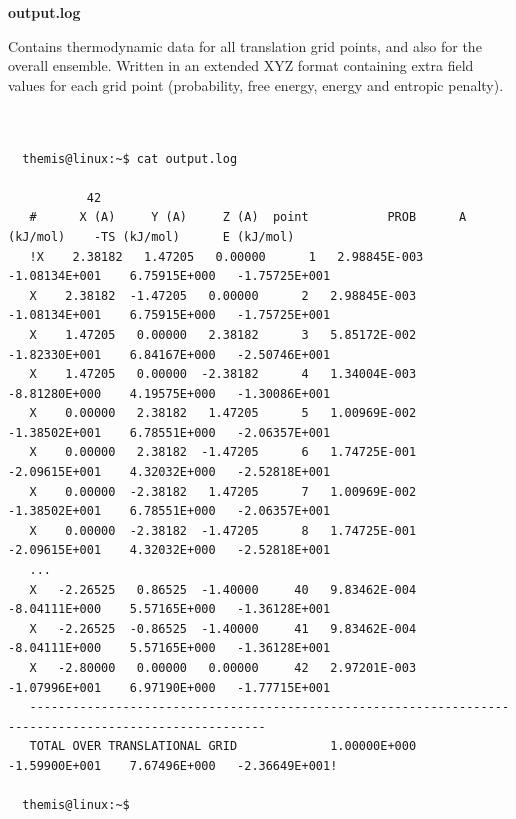 \documentclass[10pt,a4paper]{report}
\begin{document}
\textbf{output.log}

  Contains thermodynamic data for all translation grid points, and also for the
  overall ensemble. Written in an extended XYZ format containing extra field values 
  for each grid point (probability, free energy, energy and entropic penalty). \\~


\begin{center}
  \begin{minipage}{0.90\textwidth}
    \vskip0.25cm
    \begin{verbatim}

  themis@linux:~$ cat output.log

           42
   #      X (A)     Y (A)     Z (A)  point           PROB      A (kJ/mol)    -TS (kJ/mol)      E (kJ/mol)
   !X    2.38182   1.47205   0.00000      1   2.98845E-003   -1.08134E+001    6.75915E+000   -1.75725E+001
   X    2.38182  -1.47205   0.00000      2   2.98845E-003   -1.08134E+001    6.75915E+000   -1.75725E+001
   X    1.47205   0.00000   2.38182      3   5.85172E-002   -1.82330E+001    6.84167E+000   -2.50746E+001
   X    1.47205   0.00000  -2.38182      4   1.34004E-003   -8.81280E+000    4.19575E+000   -1.30086E+001
   X    0.00000   2.38182   1.47205      5   1.00969E-002   -1.38502E+001    6.78551E+000   -2.06357E+001
   X    0.00000   2.38182  -1.47205      6   1.74725E-001   -2.09615E+001    4.32032E+000   -2.52818E+001
   X    0.00000  -2.38182   1.47205      7   1.00969E-002   -1.38502E+001    6.78551E+000   -2.06357E+001
   X    0.00000  -2.38182  -1.47205      8   1.74725E-001   -2.09615E+001    4.32032E+000   -2.52818E+001
   ...
   X   -2.26525   0.86525  -1.40000     40   9.83462E-004   -8.04111E+000    5.57165E+000   -1.36128E+001
   X   -2.26525  -0.86525  -1.40000     41   9.83462E-004   -8.04111E+000    5.57165E+000   -1.36128E+001
   X   -2.80000   0.00000   0.00000     42   2.97201E-003   -1.07996E+001    6.97190E+000   -1.77715E+001
   -------------------------------------------------------------------------------------------------------
   TOTAL OVER TRANSLATIONAL GRID             1.00000E+000   -1.59900E+001    7.67496E+000   -2.36649E+001!

  themis@linux:~$ 

    \end{verbatim}
  \end{minipage}%
\end{center}
\end{document}

